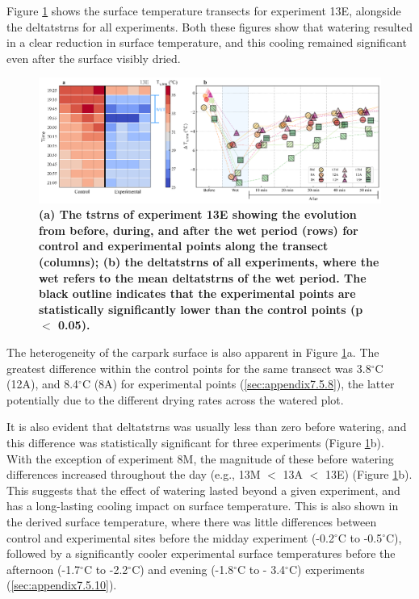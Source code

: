 \documentclass[final,3p,times,authoryear]{elsarticle}
\begin{document}
Figure \ref{fig:3.5} shows the surface temperature transects for experiment 13E, alongside the \gls{deltatstrns} for all experiments. Both these figures show that watering resulted in a clear reduction in surface temperature, and this cooling remained significant even after the surface visibly dried.

\begin{figure}
\centering
\includegraphics[trim={0 0 0 0},clip,scale=1.0]{pict016.png}
\caption{\bf (a) The \gls{tstrns} of experiment 13E showing the evolution from before, during, and after the wet period (rows) for control and experimental points along the transect (columns); (b) the \gls{deltatstrns} of all experiments, where the wet refers to the mean \gls{deltatstrns} of the wet period. The black outline indicates that the experimental points are statistically significantly lower than the control points (\gls{p} $<$ 0.05).}
 \label{fig:3.5}
\end{figure}

The heterogeneity of the carpark surface is also apparent in Figure \ref{fig:3.5}a. The greatest difference within the control points for the same transect was 3.8$^{\circ}$C (12A), and 8.4$^{\circ}$C (8A) for experimental points (\ref{sec:appendix7.5.8}), the latter potentially due to the different drying rates across the watered plot.

It is also evident that \gls{deltatstrns} was usually less than zero before watering, and this difference was statistically significant for three experiments (Figure \ref{fig:3.5}b). With the exception of experiment 8M, the magnitude of these before watering differences increased throughout the day (e.g., 13M $<$ 13A $<$ 13E) (Figure \ref{fig:3.5}b). This suggests that the effect of watering lasted beyond a given experiment, and has a long-lasting cooling impact on surface temperature. This is also shown in the derived surface temperature, where there was little differences between control and experimental sites before the midday experiment (-0.2$^{\circ}$C to -0.5$^{\circ}$C), followed by a significantly cooler experimental surface temperatures before the afternoon (-1.7$^{\circ}$C to -2.2$^{\circ}$C) and evening (-1.8$^{\circ}$C to -
3.4$^{\circ}$C) experiments (\ref{sec:appendix7.5.10}).
\end{document}
